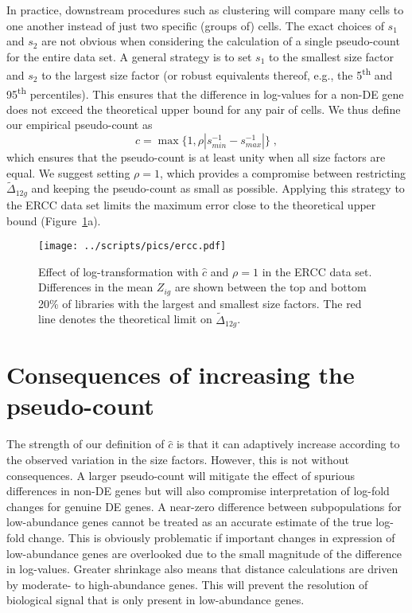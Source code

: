 \documentclass[10pt,letterpaper]{article}
\begin{document}
In practice, downstream procedures such as clustering will compare many cells to one another instead of just two specific (groups of) cells.
The exact choices of $s_1$ and $s_2$ are not obvious when considering the calculation of a single pseudo-count for the entire data set.
A general strategy is to set $s_1$ to the smallest size factor and $s_2$ to the largest size factor
(or robust equivalents thereof, e.g., the 5\textsuperscript{th} and 95\textsuperscript{th} percentiles).
This ensures that the difference in log-values for a non-DE gene does not exceed the theoretical upper bound for any pair of cells.
We thus define our empirical pseudo-count as
\[
\hat c = \max\{1, \rho |s_{min}^{-1} - s_{max}^{-1}|\} \;,
\]
which ensures that the pseudo-count is at least unity when all size factors are equal.
We suggest setting $\rho=1$, which provides a compromise between restricting $\tilde\Delta_{12g}$ and keeping the pseudo-count as small as possible.
Applying this strategy to the ERCC data set limits the maximum error close to the theoretical upper bound (Figure~\ref{fig:bigreal}a).

\begin{figure}
\begin{center}
    \texttt{[image: ../scripts/pics/ercc.pdf]}
\end{center}
\caption{Effect of log-transformation with $\hat c$ and $\rho =1$ in the ERCC data set.
Differences in the mean $Z_{ig}$ are shown between the top and bottom 20\% of libraries with the largest and smallest size factors.
The red line denotes the theoretical limit on $\tilde \Delta_{12g}$.}
\label{fig:bigreal}
\end{figure}

\section{Consequences of increasing the pseudo-count}
The strength of our definition of $\hat c$ is that it can adaptively increase according to the observed variation in the size factors.
However, this is not without consequences.
A larger pseudo-count will mitigate the effect of spurious differences in non-DE genes but will also compromise interpretation of log-fold changes for genuine DE genes.
A near-zero difference between subpopulations for low-abundance genes cannot be treated as an accurate estimate of the true log-fold change. 
This is obviously problematic if important changes in expression of low-abundance genes are overlooked due to the small magnitude of the difference in log-values.
Greater shrinkage also means that distance calculations are driven by moderate- to high-abundance genes.
This will prevent the resolution of biological signal that is only present in low-abundance genes.
\end{document}
